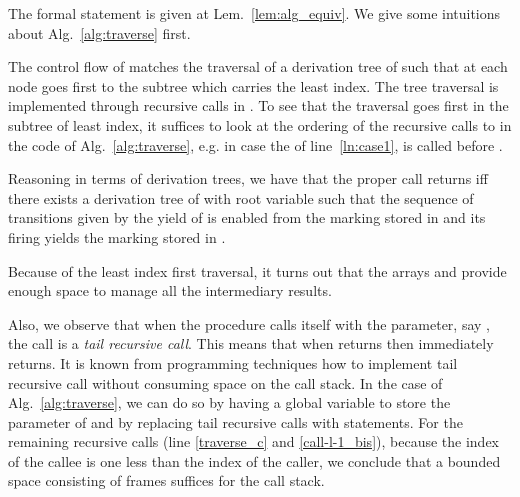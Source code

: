 \documentclass{fsttcs}
\begin{document}
\noindent {}
\begin{minipage}[t]{.5\linewidth}
	\vspace{0pt}
\begin{algorithm}[H]
   {\small    \DontPrintSemicolon
\KwIn{}
			 \caption{\label{alg:add}}}
\end{algorithm}\end{minipage}
\begin{minipage}[t]{.35\linewidth}
	\vspace{0pt}
\begin{algorithm}[H]
     {\small  \DontPrintSemicolon
\KwIn{}
			 \caption{\label{alg:transfer}}}
\end{algorithm}\end{minipage}\hfill\hspace{0pt}



The formal statement is given at Lem.~\ref{lem:alg_equiv}. We give some
intuitions about Alg.~\ref{alg:traverse} first.

\medskip

The control flow of  matches the traversal of a derivation
tree of  such that at each node  goes first to
the subtree which carries the least index. The tree traversal is implemented
through recursive calls in . To see that the traversal goes first in the subtree
of least index, it suffices to look at the ordering of the recursive calls to
 in the code of Alg.~\ref{alg:traverse}, e.g. in case the
of line~\ref{ln:case1},  is called before
.

Reasoning in terms of derivation trees, we have
that the proper call  returns if{}f there exists a derivation
tree  of  with root variable 
such that the sequence of transitions given by the yield of  is enabled
from the marking stored in  and its firing yields the marking
stored in .

Because of the least index first traversal, it turns out that the arrays
 and  provide enough space to manage
all the intermediary results.

Also, we observe that when the procedure 
calls itself with the parameter, say , the call is a \emph{tail
recursive call}. This means that when  returns
then  immediately returns.  It is known from
programming techniques how to implement tail recursive call without consuming
space on the call stack. In the case of Alg.~\ref{alg:traverse}, we can do so
by having a global variable to store the parameter of  and
by replacing tail recursive calls with  statements.  For the
remaining recursive calls (line \ref{traverse_c} and \ref{call-l-1_bis}),
because the index of the callee is one less than the index of the caller, we conclude that a bounded
space consisting of  frames suffices for the call stack.
\end{document}
